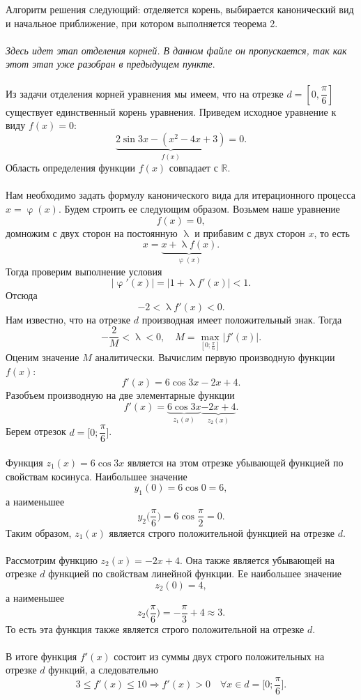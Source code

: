 \documentclass[a4paper, 12pt]{report}
\newcommand{\Rm}{\mathbb{R}}
\renewcommand{\leq}{\leqslant}
\renewcommand{\varphi}{\upvarphi}
\renewcommand{\lambda}{\uplambda}
\begin{document}
\begin{enumerate}
\begin{enumerate}
		\end{enumerate}
		Алгоритм решения следующий: отделяется корень, выбирается канонический вид и начальное приближение, при котором выполняется теорема 2.\\\\
		\textit{Здесь идет этап отделения корней. В данном файле он пропускается, так как этот этап уже разобран в предыдущем пункте}.\\\\
		Из задачи отделения корней уравнения мы имеем, что на отрезке $d = \left[0, \dfrac\pi6\right]$ существует единственный корень уравнения. Приведем исходное уравнение к виду $f(x) = 0$: $$\underbrace{2\sin 3x - (x^2 - 4x+3)}_{f(x)} = 0.$$
		Область определения функции $f(x)$ совпадает с $\Rm$.\\\\
		Нам необходимо задать формулу канонического вида для итерационного процесса $x = \varphi(x)$. Будем строить ее следующим образом. Возьмем наше уравнение $$f(x) = 0,$$ домножим с двух сторон на постоянную $\lambda$ и прибавим с двух сторон $x$, то есть $$x = \underbrace{x + \lambda f(x)}_{\varphi(x)}.$$ Тогда проверим выполнение условия $$|\varphi'(x)| = |1 + \lambda f'(x)| < 1.$$
		Отсюда $$-2< \lambda f'(x)< 0.$$ Нам известно, что на отрезке $d$ производная имеет положительный знак. Тогда $$-\dfrac{2}{M} < \lambda < 0,\quad M = \max_{[0; \frac\pi6]}|f'(x)|.$$
		Оценим значение $M$ аналитически. Вычислим первую производную функции $f(x)$:
		$$f'(x) = 6\cos 3x - 2x + 4.$$
		Разобъем производную на две элементарные функции
		$$f'(x) = \underbrace{6\cos3x}_{z_1(x)} \underbrace{- 2x + 4}_{z_2(x)}.$$
		Берем отрезок $d = \Big[0; \dfrac\pi6\Big]$. 
		\\\\
		Функция $z_1(x) = 6\cos3x$ является на этом отрезке убывающей функцией по свойствам косинуса. Наибольшее значение $$y_1(0)= 6\cos0 = 6,$$ а наименьшее $$y_2\Big(\dfrac\pi6\Big) = 6\cos\dfrac\pi2 = 0.$$
		Таким образом, $z_1(x)$ является строго положительной функцией на отрезке $d$. 
		\\\\
		Рассмотрим функцию $z_2(x) = -2x + 4$. Она также является убывающей на отрезке $d$ функцией по свойствам линейной функции. Ее наибольшее значение $$z_2(0) = 4,$$ а наименьшее $$z_2\Big(\dfrac\pi6\Big) = -\dfrac\pi3 + 4\approx 3.$$
		То есть эта функция также является строго положительной на отрезке $d$. 
		\\\\
		В итоге функция $f'(x)$ состоит из суммы двух строго положительных на отрезке $d$ функций, а следовательно $$3 \leq f'(x) \leq 10 \Rightarrow f'(x) > 0\quad \forall x \in d=\Big[0; \dfrac\pi6\Big].$$

\end{enumerate}
\end{document}
